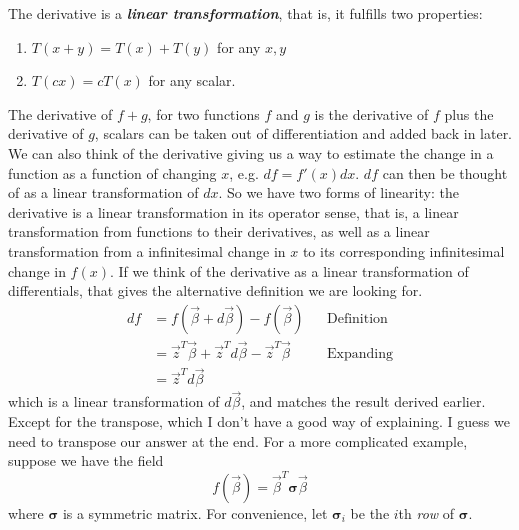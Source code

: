 \documentclass[11pt, oneside]{article}
\newcommand{\emphasis}[1]{\textbf{\textit{#1}}}
\begin{document}
The derivative is a \emphasis{linear transformation}, that is, it fulfills
two properties:
\begin{enumerate}
    \item \( T(x + y) = T(x) + T(y) \) for any \( x, y \)
    \item \( T(cx) = cT(x) \) for any scalar.
\end{enumerate}
The derivative of \( f + g \), for two functions \( f \) and \( g \) is
the derivative of \( f \) plus the derivative of \( g \), scalars can be
taken out of differentiation and added back in later.
We can also think of the derivative giving us a way to estimate the change in a
function as a function of changing \( x \), e.g. \( df = f'(x) dx \). \( df \)
can then be thought of as a linear transformation of \( dx \). So we have two
forms of linearity: the derivative is a linear transformation in its operator 
sense, that is, a linear transformation from functions to their derivatives,
as well as a linear transformation from a infinitesimal change in \( x \)
to its corresponding infinitesimal change in \( f(x) \).
If we think of the derivative as a linear transformation of differentials,
that gives the alternative definition we are looking for.
\begin{align*}
    df &= f(\vec{\beta} + d\vec{\beta}) - f(\vec{\beta}) && \text{Definition} \\
       &= \vec{z}^T \vec{\beta} + \vec{z}^T d \vec{\beta} - \vec{z}^T \vec{\beta} && \text{Expanding} \\
       &= \vec{z}^T d \vec{\beta}  
\end{align*}
which is a linear transformation of \( d \vec{\beta} \), and matches the result
derived earlier. Except for the transpose, which I don't have a good way of
explaining. I guess we need to transpose our answer at the end.  
For a more complicated example, suppose we have the field
\[ f(\vec{\beta}) = \vec{\beta}^T \bm{\sigma} \vec{\beta} \]
where \( \bm{\sigma} \) is a symmetric matrix.
For convenience, let \( \bm{\sigma}_i \) be the \( i \)th
\textit{row} of \( \bm{\sigma} \).
\end{document}
